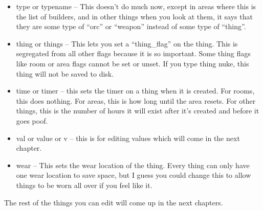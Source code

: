 \begin{itemize}
\item type or typename -- This doesn't do much now, except in areas where this is the list of builders, and in other things when you look at them, it says that they are some type of ``orc'' or ``weapon'' instead of some type of ``thing''.

\item thing or things -- This lets you set a ``thing\_flag'' on the thing. This is segregated from all other flags because it is so important. Some thing flags like room or area flags cannot be set or unset. If you type thing nuke, this thing will not be saved to disk.


\item time or timer -- this sets the timer on a thing when it is created. For rooms, this does nothing. For areas, this is how long until the area resets. For other things, this is the number of hours it will exist after it's created and before it goes poof.


\item val or value or v -- this is for editing values which will come in the next chapter.

\item wear -- This sets the wear location of the thing. Every thing can only have one wear location to save space, but I guess you could change this to allow things to be worn all over if you feel like it.

\end{itemize}


The rest of the things you can edit will come up in the next chapters.


